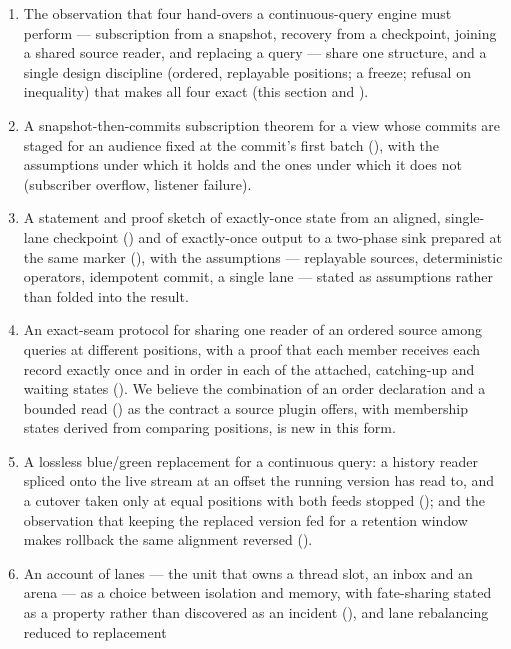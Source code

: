 \documentclass[11pt,a4paper]{article}
\renewcommand{\_}{\oldunderscore\allowbreak}
\newcommand{\code}[1]{\texttt{\pvbreakable{#1}}}
\begin{document}
\begin{enumerate}[leftmargin=*,itemsep=3pt]
\item The observation that four hand-overs a continuous-query engine must perform --- subscription
      from a snapshot, recovery from a checkpoint, joining a shared source reader, and replacing a
      query --- share one structure, and a single design discipline (ordered, replayable positions;
      a freeze; refusal on inequality) that makes all four exact (this section and
      ).
\item A snapshot-then-commits subscription theorem for a view whose commits are staged for an
      audience fixed at the commit's first batch (), with the assumptions under
      which it holds and the ones under which it does not (subscriber overflow, listener failure).
\item A statement and proof sketch of exactly-once state from an aligned, single-lane checkpoint
      () and of exactly-once output to a two-phase sink prepared at the same marker
      (), with the assumptions --- replayable sources, deterministic operators,
      idempotent commit, a single lane --- stated as assumptions rather than folded into the result.
\item An exact-seam protocol for sharing one reader of an ordered source among queries at different
      positions, with a proof that each member receives each record exactly once and in order in each
      of the attached, catching-up and waiting states (). We believe the combination
      of an order declaration and a bounded read (\code{pollBefore}) as the contract a source plugin
      offers, with membership states derived from comparing positions, is new in this form.
\item A lossless blue/green replacement for a continuous query: a history reader spliced onto the live
      stream at an offset the running version has read to, and a cutover taken only at equal positions
      with both feeds stopped (); and the observation that keeping the
      replaced version fed for a retention window makes rollback the same alignment reversed
      ().
\item An account of lanes --- the unit that owns a thread slot, an inbox and an arena --- as a choice
      between isolation and memory, with fate-sharing stated as a property rather than discovered as
      an incident (), and lane rebalancing reduced to replacement

\end{enumerate}
\end{document}
